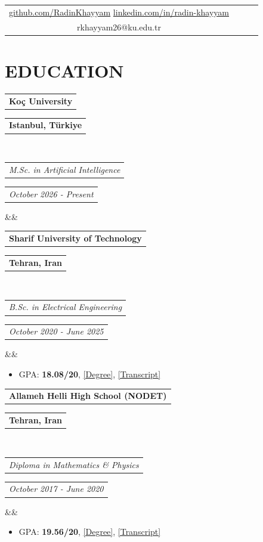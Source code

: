 \documentclass[11pt,a4paper,roman]{moderncv}        %
\makeatletter
\newcommand*{\customcventry}[7][.25em]{
	\begin{tabular}{@{}l} 
		{\bfseries #4}
	\end{tabular}
	\hfill%
	\begin{tabular}{l@{}}
		{\bfseries #5}
	\end{tabular} \\
	\begin{tabular}{@{}l} 
		{\itshape #3}
	\end{tabular}
	\hfill%
	\begin{tabular}{l@{}}
		{\itshape #2}
	\end{tabular}
	\ifx&#7&%
	\else{\\%
		\begin{minipage}{\maincolumnwidth}%
			\small#7%
	\end{minipage}}\fi%
	\par\addvspace{#1}}
\makeatother
\begin{document}
 \makecvtitle
 \vspace{-1.5cm}

	\begin{center}
		\renewcommand{\arraystretch}{1.3}
		\begin{tabular}{ c c c c }
			\faGithub\enspace \href{https://github.com/RadinKhayyam}{github.com/RadinKhayyam}  \enspace \faLinkedin\enspace \href{https://www.linkedin.com/in/radin-khayyam/}{linkedin.com/in/radin-khayyam}  \\
			\faEnvelope\enspace rkhayyam26@ku.edu.tr \enspace  \enspace \\
		\end{tabular}
	\end{center}
	
    \vspace{-7mm}
    
	\section{EDUCATION}
    \customcventry{October 2026 - Present}{M.Sc. in Artificial Intelligence}{Koç University}{Istanbul, Türkiye}{}{}
	\customcventry{October 2020 - June 2025}{B.Sc. in Electrical Engineering}{Sharif University of Technology}{Tehran, Iran}{}{}
	\begin{itemize}
		\item[--] GPA: \textbf{18.08/20}, \href{https://drive.google.com/file/d/1xb0G3UMFrPR6_VdK-hFIWO8DOwEuEKgZ/view?usp=share_link}{\textcolor{blue link}{[Degree]}}, \href{https://drive.google.com/file/d/1Es8wghvSRvhHpGdkV1DL5RxTR4IFMHGq/view?usp=share_link}{\textcolor{blue link}{[Transcript]}}
	\end{itemize}
	\customcventry{October 2017 - June 2020}{Diploma in Mathematics \& Physics}{Allameh Helli High School (NODET)}{Tehran, Iran}{}{}
	\begin{itemize}
		\item[--] GPA: \textbf{19.56/20}, \href{https://drive.google.com/file/d/1MYahKXO-GKPNp0Mal03CKn-OioZAOS_m/view?usp=share_link}{\textcolor{blue link}{[Degree]}}, \href{https://drive.google.com/file/d/19djq3UQhfH81OSBXT1YG28veKX4pr2ZK/view?usp=share_link}{\textcolor{blue link}{[Transcript]}}
	\end{itemize}
\vspace{-3mm}
\end{document}
